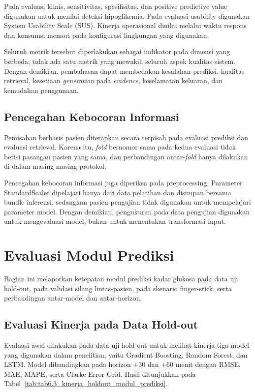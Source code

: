 Pada evaluasi klinis, sensitivitas, spesifisitas, dan positive predictive value digunakan untuk menilai deteksi hipoglikemia. Pada evaluasi usability digunakan
System Usability Scale (SUS). Kinerja operasional dinilai melalui waktu respons dan konsumsi memori pada konfigurasi lingkungan yang digunakan.

Seluruh metrik tersebut diperlakukan sebagai indikator pada dimensi yang berbeda; tidak ada satu metrik yang mewakili seluruh aspek kualitas sistem. Dengan
demikian, pembahasan dapat membedakan kesalahan prediksi, kualitas retrieval, kesetiaan \textit{generation} pada \textit{evidence}, keselamatan keluaran, dan
kemudahan penggunaan.

\subsection{Pencegahan Kebocoran Informasi}
\label{subsec:bab6-pencegahan-kebocoran-informasi}

Pemisahan berbasis pasien diterapkan secara terpisah pada evaluasi prediksi dan evaluasi retrieval. Karena itu, \textit{fold} bernomor sama pada kedua evaluasi
tidak berisi pasangan pasien yang sama, dan perbandingan antar-\textit{fold} hanya dilakukan di dalam masing-masing protokol.

Pencegahan kebocoran informasi juga diperiksa pada preprocessing. Parameter StandardScaler dipelajari hanya dari data pelatihan dan disimpan bersama bundle inferensi,
sedangkan pasien pengujian tidak digunakan untuk mempelajari parameter model. Dengan demikian, pengukuran pada data pengujian digunakan untuk mengevaluasi model,
bukan untuk menentukan transformasi input.

\section{Evaluasi Modul Prediksi}
\label{sec:bab6-evaluasi-modul-prediksi}

Bagian ini melaporkan ketepatan modul prediksi kadar glukosa pada data uji hold-out, pada validasi silang lintas-pasien, pada skenario finger-stick,
serta perbandingan antar-model dan antar-horizon.

\subsection{Evaluasi Kinerja pada Data Hold-out}
\label{subsec:bab6-evaluasi-holdout-prediksi}

Evaluasi awal dilakukan pada data uji hold-out untuk melihat kinerja tiga model yang digunakan dalam penelitian, yaitu Gradient Boosting, Random Forest, dan LSTM.
Model dibandingkan pada horizon +30 dan +60 menit dengan RMSE, MAE, MAPE, serta Clarke Error Grid. Hasil ditunjukkan pada
Tabel~\ref{tab:tab6.3_kinerja_holdout_modul_prediksi}.


